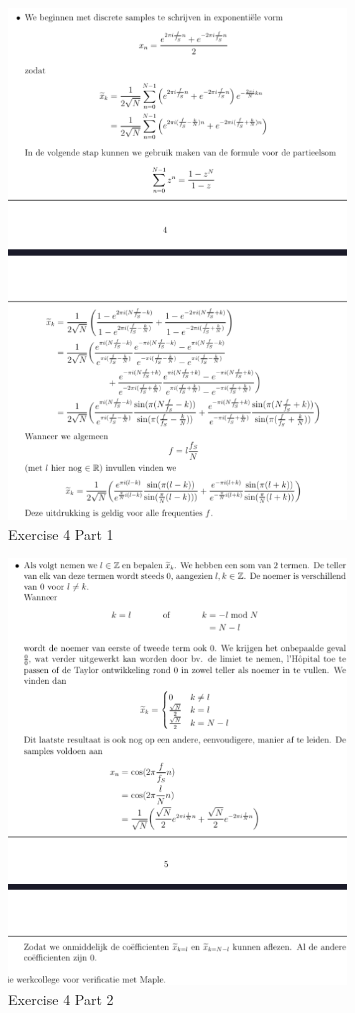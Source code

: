\documentclass[a4paper]{report}
\begin{document}
\begin{figure}[H]
	\centering
	\includegraphics[width=0.8\textwidth]{assets/bord_9_ex_4_part_1.png}
	\caption{Exercise 4 Part 1}
	\label{fig:bord_9_ex_4_part_1}
\end{figure}

\begin{figure}[H]
	\centering
	\includegraphics[width=0.8\textwidth]{assets/bord_9_ex_4_part_2.png}
	\caption{Exercise 4 Part 2}
	\label{fig:bord_9_ex_4_part_2}
\end{figure}
\end{document}
